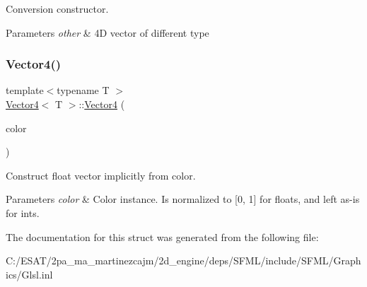 Conversion constructor. 


\begin{DoxyParams}{Parameters}
{\em other} & 4D vector of different type \\
\hline
\end{DoxyParams}
\mbox{\label{struct_vector4_af1da65a743ddbb5c779b41eae766c00d}} 
\subsubsection{\texorpdfstring{Vector4()}{Vector4()}\hspace{0.1cm}{\footnotesize\ttfamily [3/3]}}
{\footnotesize\ttfamily template$<$typename T $>$ \\
\hyperlink{struct_vector4}{Vector4}$<$ T $>$\+::\hyperlink{struct_vector4}{Vector4} (\begin{DoxyParamCaption}\item[{const Color \&}]{color }\end{DoxyParamCaption})\hspace{0.3cm}{\ttfamily [inline]}}



Construct float vector implicitly from color. 


\begin{DoxyParams}{Parameters}
{\em color} & Color instance. Is normalized to \mbox{[}0, 1\mbox{]} for floats, and left as-\/is for ints. \\
\hline
\end{DoxyParams}


The documentation for this struct was generated from the following file\+:\begin{DoxyCompactItemize}
\item 
C\+:/\+E\+S\+A\+T/2pa\+\_\+ma\+\_\+martinezcajm/2d\+\_\+engine/deps/\+S\+F\+M\+L/include/\+S\+F\+M\+L/\+Graphics/Glsl.\+inl\end{DoxyCompactItemize}
